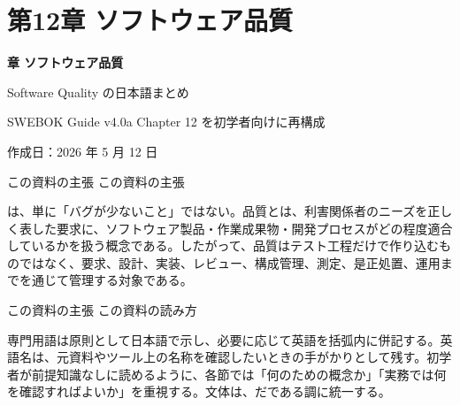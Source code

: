 \section{第12章 ソフトウェア品質}
{\Huge\bfseries{} 章 ソフトウェア品質\par}
{\Large Software Quality の日本語まとめ\par}
{\normalsize SWEBOK Guide v4.0a Chapter 12 を初学者向けに再構成\par}
{\normalsize 作成日：2026 年 5 月 12 日\par}

\begin{pointbox}{この資料の主張}
この資料の主張\par
{}は、単に「バグが少ないこと」ではない。品質とは、利害関係者のニーズを正しく表した要求に、ソフトウェア製品・作業成果物・開発プロセスがどの程度適合しているかを扱う概念である。したがって、品質はテスト工程だけで作り込むものではなく、要求、設計、実装、レビュー、構成管理、測定、是正処置、運用までを通じて管理する対象である。
\end{pointbox}

\begin{pointbox}{この資料の主張}
この資料の読み方\par
専門用語は原則として日本語で示し、必要に応じて英語を括弧内に併記する。英語名は、元資料やツール上の名称を確認したいときの手がかりとして残す。初学者が前提知識なしに読めるように、各節では「何のための概念か」「実務では何を確認すればよいか」を重視する。文体は、だである調に統一する。
\end{pointbox}
